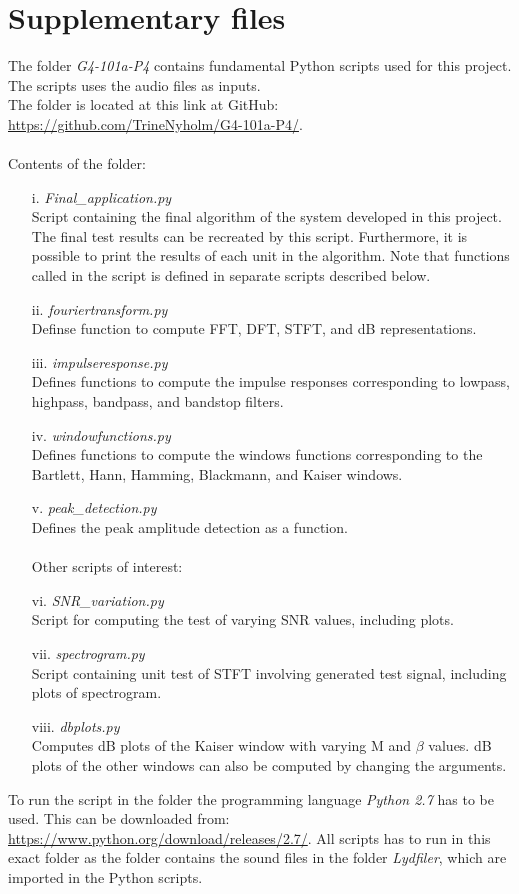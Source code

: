 \clearpage
\chapter{Supplementary files} \label{app:sup}
The folder \textit{G4-101a-P4} contains fundamental Python scripts used for this project. The scripts uses the audio files as inputs. 
\\
The folder is located at this link at GitHub: \url{https://github.com/TrineNyholm/G4-101a-P4/}.  \\
\\
Contents of the folder:
\begin{itemize}
\item[i.]\textit{Final\_application.py} \\
Script containing the final algorithm of the system developed in this project. The final test results can be recreated by this script. Furthermore, it is possible to print the results of each unit in the algorithm. Note that functions called in the script is defined in separate scripts described below.   

\item[ii.]\textit{fouriertransform.py}\\
Definse function to compute FFT, DFT, STFT, and dB representations.
 
\item[iii.] \textit{impulseresponse.py}\\
Defines functions to compute the impulse responses corresponding to lowpass, highpass, bandpass, and bandstop filters.
\item[iv.] \textit{windowfunctions.py}\\
Defines functions to compute the windows functions corresponding to the Bartlett, Hann, Hamming, Blackmann, and Kaiser windows. 
\item[v.] \textit{peak\_detection.py} \\
Defines the peak amplitude detection as a function.
\\
\\
Other scripts of interest:
\item[vi.] \textit{SNR\_variation.py} \\
Script for computing the test of varying SNR values, including plots.  
\item[vii.]\textit{spectrogram.py}\\
Script containing unit test of STFT involving generated test signal, including plots of spectrogram. 
\item[viii.] \textit{dbplots.py} \\
Computes dB plots of the Kaiser window with varying M and $\beta$ values. dB plots of the other windows can also be computed by changing the arguments.
\end{itemize}

To run the script in the folder the programming language \textit{Python 2.7} has to be used. This can be downloaded from: \url{https://www.python.org/download/releases/2.7/}. All scripts has to run in this exact folder as the folder contains the sound files in the folder \textit{Lydfiler}, which are imported in the Python scripts.